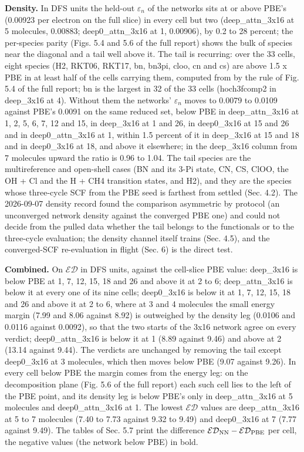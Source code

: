 \documentclass[10pt,a4paper]{article}
\begin{document}
\textbf{Density.} In DFS units the held-out $\varepsilon_n$ of the networks sits at or above PBE's (0.00923 per electron on the full slice) in every cell but two (deep\_attn\_3x16 at 5 molecules, 0.00883; deep0\_attn\_3x16 at 1, 0.00906), by 0.2 to 28 percent; the per-species parity (Figs. 5.4 and 5.6 of the full report) shows the bulk of species near the diagonal and a tail well above it. The tail is recurring: over the 33 cells, eight species (H2, RKT06, RKT17, bn, bn3pi, cloo, cn and cs) are above 1.5 x PBE in at least half of the cells carrying them, computed from  by the rule of Fig. 5.4 of the full report; bn is the largest in 32 of the 33 cells (hoch3fcomp2 in deep\_3x16 at 4). Without them the networks' $\varepsilon_n$ moves to 0.0079 to 0.0109 against PBE's 0.0091 on the same reduced set, below PBE in deep\_attn\_3x16 at 1, 2, 5, 6, 7, 12 and 15, in deep\_3x16 at 1 and 26, in deep0\_3x16 at 15 and 26 and in deep0\_attn\_3x16 at 1, within 1.5 percent of it in deep\_3x16 at 15 and 18 and in deep0\_3x16 at 18, and above it elsewhere; in the deep\_3x16 column from 7 molecules upward the ratio is 0.96 to 1.04. The tail species are the multireference and open-shell cases (BN and its 3-Pi state, CN, CS, ClOO, the OH + Cl and the H + CH4 transition states, and H2), and they are the species whose three-cycle SCF from the PBE seed is farthest from settled (Sec. 4.2). The 2026-09-07 density record found the comparison asymmetric by protocol (an unconverged network density against the converged PBE one) and could not decide from the pulled data whether the tail belongs to the functionals or to the three-cycle evaluation; the density channel itself trains (Sec. 4.5), and the converged-SCF re-evaluation in flight (Sec. 6) is the direct test.

\textbf{Combined.} On $\mathcal{ED}$ in DFS units, against the cell-slice PBE value: deep\_3x16 is below PBE at 1, 7, 12, 15, 18 and 26 and above it at 2 to 6; deep\_attn\_3x16 is below it at every one of its nine cells; deep0\_3x16 is below it at 1, 7, 12, 15, 18 and 26 and above it at 2 to 6, where at 3 and 4 molecules the small energy margin (7.99 and 8.06 against 8.92) is outweighed by the density leg (0.0106 and 0.0116 against 0.0092), so that the two starts of the 3x16 network agree on every verdict; deep0\_attn\_3x16 is below it at 1 (8.89 against 9.46) and above at 2 (13.14 against 9.44). The verdicts are unchanged by removing the tail except deep0\_3x16 at 3 molecules, which then moves below PBE (9.07 against 9.26). In every cell below PBE the margin comes from the energy leg: on the decomposition plane (Fig. 5.6 of the full report) each such cell lies to the left of the PBE point, and its density leg is below PBE's only in deep\_attn\_3x16 at 5 molecules and deep0\_attn\_3x16 at 1. The lowest $\mathcal{ED}$ values are deep\_attn\_3x16 at 5 to 7 molecules (7.40 to 7.73 against 9.32 to 9.49) and deep0\_3x16 at 7 (7.77 against 9.49). The tables of Sec. 5.7 print the difference $\mathcal{ED}_{\rm NN} - \mathcal{ED}_{\rm PBE}$ per cell, the negative values (the network below PBE) in bold.
\end{document}
